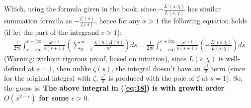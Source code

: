 \documentclass{article}
\begin{document}
Which, using the formula given in the book, since $-\frac{L'(s,\chi)}{L(s,\chi)}$ has similar summation formula as $-\frac{\zeta'(s)}{\zeta(s)}$, hence for any $x>1$ the following equation holds (if let the part of the integrand $c>1$):
\begin{equation}
    \label{eq:18}
    \begin{split}
        \frac{1}{2\pi i}\int_{c-i\infty}^{c+i\infty}\frac{x^{s+1}}{s(s+1)}\left(\sum_{n=1}^{\infty}\frac{\chi(n)\Lambda(n)}{n^s}\right)ds=\frac{1}{2\pi i}\int_{c-i\infty}^{c+i\infty}\frac{x^{s+1}}{s(s+1)}\left(-\frac{L'(s,\chi)}{L(s,\chi)}\right)ds
    \end{split}
\end{equation}
(Warning: without rigorous proof, based on intuition), since $L(s,\chi)$ is well-defined at $s=1$, then unlike $\zeta(s)$, the integral doesn't have an $\frac{x^2}{2}$ term (since for the original integral with $\zeta$, $\frac{x^2}{2}$ is produced with the pole of $\zeta$ at $s=1$). So, the guess is: \textbf{\label{guess:1}The above integral in (\ref{eq:18}) is with growth order $O(x^{2-\epsilon})$ for some $\epsilon>0$}.

\hfil
\end{document}
